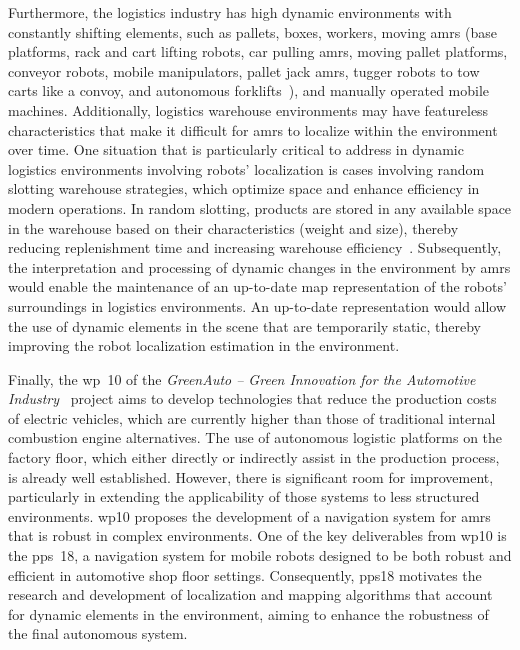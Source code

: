 Furthermore, the logistics industry has high dynamic environments with
constantly shifting elements, such as pallets, boxes, workers,
moving \glspl{amr} (base platforms, rack and cart lifting robots,
car pulling \glspl{amr}, moving pallet platforms, conveyor robots,
mobile manipulators, pallet jack \glspl{amr}, tugger robots to tow carts like a
convoy, and autonomous forklifts~\cite{pastor:agv-network}),
and manually operated mobile machines.
Additionally, logistics warehouse environments may have featureless
characteristics that make it difficult for \glspl{amr} to localize within the
environment over time.
One situation that is particularly critical to address in dynamic logistics
environments involving robots' localization is cases involving random slotting
warehouse strategies, which optimize space and enhance efficiency in modern
operations.
In random slotting, products are stored in any available space in the warehouse
based on their characteristics (weight and size), thereby reducing replenishment
time and increasing warehouse efficiency~\cite{cisneros:qmh:2025}.
Subsequently, the interpretation and processing of dynamic changes in the
environment by \glspl{amr} would enable the maintenance of an up-to-date map
representation of the robots' surroundings in logistics environments.
An up-to-date representation would allow the use of dynamic elements in the
scene that are temporarily static, thereby improving the robot localization
estimation in the environment.

Finally, the \gls{wp}~10 of the
\textit{GreenAuto -- Green Innovation for the Automotive Industry}~\cite{greenauto}
project aims to develop technologies that reduce the production costs of
electric vehicles, which are currently higher than those of
traditional internal combustion engine alternatives.
The use of autonomous logistic platforms on the factory floor,
which either directly or indirectly assist in the production process,
is already well established.
However, there is significant room for improvement, particularly in
extending the applicability of those systems to less structured environments.
\gls{wp}10 proposes the development of a navigation system for \glspl{amr}
that is robust in complex environments. One of the key deliverables from
\gls{wp}10 is the \gls{pps}~18, a navigation system for mobile robots
designed to be both robust and efficient in automotive shop floor settings.
Consequently, \gls{pps}18 motivates the research and development of
localization and mapping algorithms that account for dynamic elements
in the environment, aiming to enhance the robustness of the final autonomous system.


